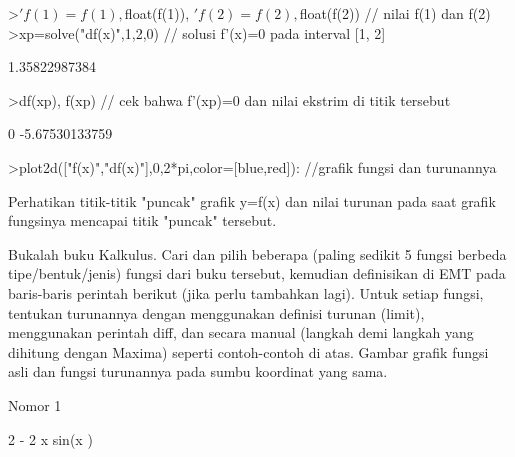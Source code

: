\documentclass[a4paper,10pt]{article}
\begin{document}
\begin{eulernotebook}
\begin{eulercomment}
\begin{eulercomment}
\begin{eulercomment}
\begin{eulercomment}
\begin{eulercomment}
\begin{eulercomment}
\begin{eulercomment}
\begin{eulercomment}
\begin{eulercomment}
\begin{eulercomment}
\begin{eulercomment}
\begin{eulercomment}
\begin{eulercomment}
\begin{eulercomment}
\begin{eulercomment}
\begin{eulercomment}
\begin{eulercomment}
\begin{eulercomment}
\begin{eulercomment}
\begin{eulercomment}
\begin{eulercomment}
\begin{eulercomment}
\begin{euleroutput}
\end{euleroutput}
\begin{eulerprompt}
>$'f(1)=f(1), $float(f(1)), $'f(2)=f(2), $float(f(2)) // nilai f(1) dan f(2)
>xp=solve("df(x)",1,2,0) // solusi f'(x)=0 pada interval [1, 2]
\end{eulerprompt}
\begin{euleroutput}
  1.35822987384
\end{euleroutput}
\begin{eulerprompt}
>df(xp), f(xp) // cek bahwa f'(xp)=0 dan nilai ekstrim di titik tersebut
\end{eulerprompt}
\begin{euleroutput}
  0
  -5.67530133759
\end{euleroutput}
\begin{eulerprompt}
>plot2d(["f(x)","df(x)"],0,2*pi,color=[blue,red]): //grafik fungsi dan turunannya
\end{eulerprompt}
\begin{eulercomment}
Perhatikan titik-titik "puncak" grafik y=f(x) dan nilai turunan pada
saat grafik fungsinya mencapai titik "puncak" tersebut.
\end{eulercomment}
\begin{eulercomment}
Bukalah buku Kalkulus. Cari dan pilih beberapa (paling sedikit 5
fungsi berbeda tipe/bentuk/jenis) fungsi dari buku tersebut, kemudian
definisikan di EMT pada baris-baris perintah berikut (jika perlu
tambahkan lagi). Untuk setiap fungsi, tentukan turunannya dengan
menggunakan definisi turunan (limit), menggunakan perintah diff, dan
secara manual (langkah demi langkah yang dihitung dengan Maxima)
seperti contoh-contoh di atas. Gambar grafik fungsi asli dan fungsi
turunannya pada sumbu koordinat yang sama.

Nomor 1
\end{eulercomment}
\begin{euleroutput}
  
                                         2
                              - 2 x sin(x )
  

\end{euleroutput}
\end{eulercomment}
\end{eulercomment}
\end{eulercomment}
\end{eulercomment}
\end{eulercomment}
\end{eulercomment}
\end{eulercomment}
\end{eulercomment}
\end{eulercomment}
\end{eulercomment}
\end{eulercomment}
\end{eulercomment}
\end{eulercomment}
\end{eulercomment}
\end{eulercomment}
\end{eulercomment}
\end{eulercomment}
\end{eulercomment}
\end{eulercomment}
\end{eulercomment}
\end{eulercomment}
\end{eulercomment}
\end{eulernotebook}
\end{document}
